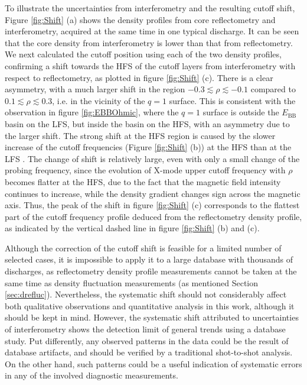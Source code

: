 To illustrate the uncertainties from interferometry and the resulting cutoff shift, Figure \ref{fig:Shift} (a) shows the density profiles from core reflectometry and interferometry, acquired at the same time in one typical discharge. It can be seen that the core density from interferometry is lower than that from reflectometry. We next calculated the cutoff position using each of the two density profiles, confirming a shift towards the HFS of the cutoff layers from interferometry with respect to reflectometry, as plotted in figure \ref{fig:Shift} (c). There is a clear asymmetry, with a much larger shift in the region $-0.3\lesssim\rho\lesssim-0.1$ compared to $0.1\lesssim\rho\lesssim0.3$, i.e. in the vicinity of the $q = 1$ surface. This is consistent with the observation in figure \ref{fig:EBBOhmic}, where the $q = 1$ surface is outside the $E_\mathrm{BB}$ basin on the LFS, but inside the basin on the HFS, with an asymmetry due to the larger shift. The strong shift at the HFS region is caused by the slower increase of the cutoff frequencies (Figure \ref{fig:Shift} (b)) at the HFS than at the LFS \cite{Mazzucato_1998_RSI}. The change of shift is relatively large, even with only a small change of the probing frequency, since the evolution of X-mode upper cutoff frequency with $\rho$ becomes flatter at the HFS, due to the fact that the magnetic field intensity continues to increase, while the density gradient changes sign across the magnetic axis. Thus, the peak of the shift in figure \ref{fig:Shift} (c) corresponds to the flattest part of the cutoff frequency profile deduced from the reflectometry density profile, as indicated by the vertical dashed line in figure \ref{fig:Shift} (b) and (c).

Although the correction of the cutoff shift is feasible for a limited number of selected cases, it is impossible to apply it to a large database with thousands of discharges, as reflectometry density profile measurements cannot be taken at the same time as density fluctuation measurements (as mentioned Section \ref{sec:drefluc}). Nevertheless, the systematic shift should not considerably affect both qualitative observations and quantitative analysis in this work, although it should be kept in mind. However, the systematic shift attributed to uncertainties of interferometry shows the detection limit of general trends using a database study. Put differently, any observed patterns in the data could be the result of database artifacts, and should be verified by a traditional shot-to-shot analysis. On the other hand, such patterns could be a useful indication of systematic errors in any of the involved diagnostic measurements.


